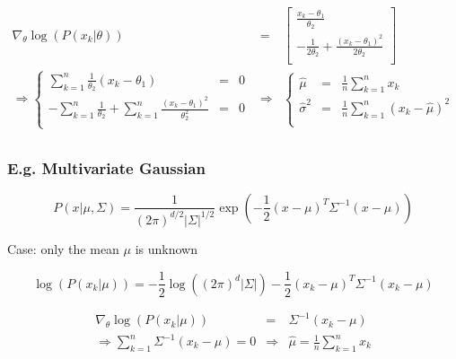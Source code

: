 \documentclass[letterpaper,10pt]{article}
\begin{document}
\begin{equation}
\begin{array}{rcl}

\nabla_\theta \log(P(x_k|\theta)) & = & \left[
\begin{array}{c}
\frac{x_k-\theta_1}{\theta_2} \\
-\frac{1}{2\theta_2}+\frac{(x_k-\theta_1)^2}{2\theta_2} \\
\end{array}\right] \\

\Rightarrow \left\{
\begin{array}{rcl}
\sum_{k=1}^{n}{\frac{1}{\theta_2}(x_k-\theta_1)} & = & 0 \\
-\sum_{k=1}^{n}{\frac{1}{\theta_2}}+\sum_{k=1}^{n}{\frac{(x_k-\theta_1)^2}{\theta_2^2}} & = & 0 \\
\end{array}\right. & \Rightarrow & \left\{
\begin{array}{rcl}
\hat{\mu} & = & \frac{1}{n}\sum_{k=1}^{n}{x_k} \\
\hat{\sigma}^2 & = & \frac{1}{n}\sum_{k=1}^{n}{(x_k-\hat{\mu})^2} \\
\end{array}\right. \\

\end{array}
\end{equation}

\subsubsection{E.g. Multivariate Gaussian}

\begin{equation}
P(x|\mu,\Sigma)=\frac{1}{(2\pi)^{d/2}|\Sigma|^{1/2}}\exp(-\frac{1}{2}(x-\mu)^T\Sigma^{-1}(x-\mu))
\end{equation}

Case: only the mean $\mu$ is unknown

\begin{equation}
\log(P(x_k|\mu)) = -\frac{1}{2}\log((2\pi)^{d}|\Sigma|)-\frac{1}{2}(x_k-\mu)^T\Sigma^{-1}(x_k-\mu)
\end{equation}

\begin{equation}
\begin{array}{rcl}
\nabla_\theta \log(P(x_k|\mu)) & = & \Sigma^{-1}(x_k-\mu) \\
\Rightarrow \sum_{k=1}^{n}{\Sigma^{-1}(x_k-\mu)} = 0 & \Rightarrow & \hat{\mu} = \frac{1}{n}\sum_{k=1}^{n}{x_k}
\end{array}
\end{equation}
\end{document}
